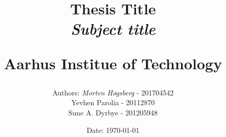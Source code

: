 \newcommand{\authorName}{Morten Høgsberg}
\newcommand{\titleName}{Thesis Title}
\newcommand{\subject}{Subject title}
\newcommand{\institute}{Aarhus Institue of Technology}
\begin{titlepage}
  \centering
    \title
    {
      \Huge \textbf{\titleName}\\
      \scale{\numberSQRTTWO}{\vspace{\sol pt}}
      \LARGE \textit{\subject}
      \scale{\numberSQRTTWO}{\rule{\linewidth}{\sol pt}}

      \textbf{\institute}
      \author
    {
      \LARGE Authors: \textit{\authorName} - 201704542\\ \LARGE Yevhen 					Parolia - 20112870\\
    	\LARGE Sune A. Dyrbye - 201205948\\
    }
      \date{\LARGE Date: \today}
    }
\end{titlepage}

